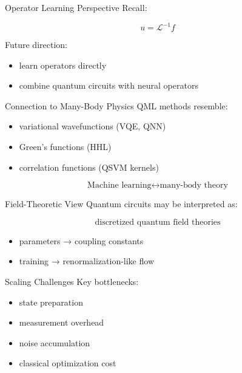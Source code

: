 \documentclass{beamer}
\begin{document}
\begin{frame}{Operator Learning Perspective}
Recall:

\[
u = \mathcal{L}^{-1}f
\]

\medskip

Future direction:

\begin{itemize}
\item learn operators directly
\item combine quantum circuits with neural operators
\end{itemize}
\end{frame}

\begin{frame}{Connection to Many-Body Physics}
QML methods resemble:

\begin{itemize}
\item variational wavefunctions (VQE, QNN)
\item Green’s functions (HHL)
\item correlation functions (QSVM kernels)
\end{itemize}

\medskip

\[
\text{Machine learning} \leftrightarrow \text{many-body theory}
\]
\end{frame}

\begin{frame}{Field-Theoretic View}
Quantum circuits may be interpreted as:

\[
\text{discretized quantum field theories}
\]

\begin{itemize}
\item parameters → coupling constants
\item training → renormalization-like flow
\end{itemize}
\end{frame}

\begin{frame}{Scaling Challenges}
Key bottlenecks:

\begin{itemize}
\item state preparation
\item measurement overhead
\item noise accumulation
\item classical optimization cost
\end{itemize}
\end{frame}
\end{document}
